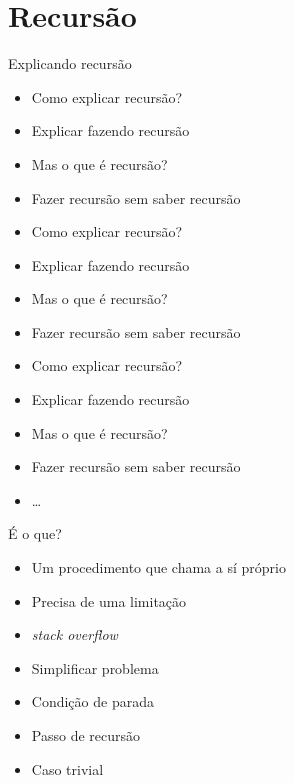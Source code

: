 \documentclass[14pt]{beamer}
\begin{document}
	\section{Recursão}
		\begin{frame}{Explicando recursão}
			\begin{itemize}
				\presentationPause\item Como explicar recursão?
				\presentationPause\item Explicar fazendo recursão
				\presentationPause\item Mas o que é recursão?
				\presentationPause\item Fazer recursão sem saber recursão
				\presentationPause\item Como explicar recursão?
				\presentationPause\item Explicar fazendo recursão
				\presentationPause\item Mas o que é recursão?
				\presentationPause\item Fazer recursão sem saber recursão
				\presentationPause\item Como explicar recursão?
				\presentationPause\item Explicar fazendo recursão
				\presentationPause\item Mas o que é recursão?
				\presentationPause\item Fazer recursão sem saber recursão
				\presentationPause\item \dots
			\end{itemize}
		\end{frame}

		\begin{frame}{É o que?}
			\begin{itemize}
				\presentationPause\item Um procedimento que chama a sí próprio
				\presentationPause\item Precisa de uma limitação
				\presentationPause\item \textit{stack overflow}
				\presentationPause\item Simplificar problema
				\presentationPause\item Condição de parada
				\presentationPause\item Passo de recursão
				\presentationPause\item Caso trivial
			\end{itemize}
		\end{frame}
\end{document}
